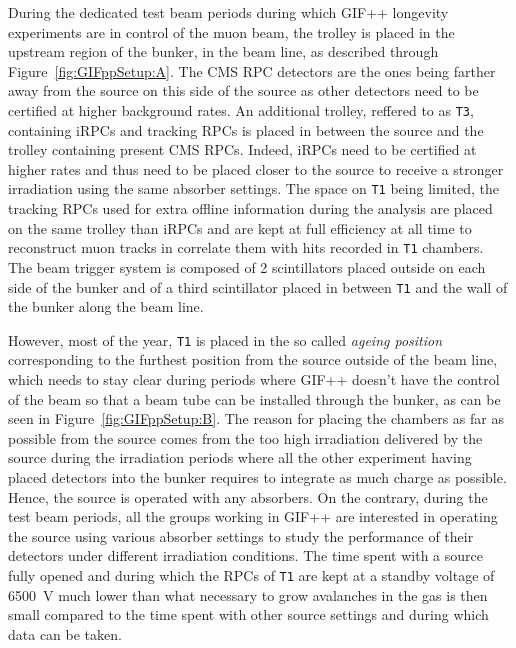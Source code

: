 	During the dedicated test beam periods during which GIF++ longevity experiments are in control of the muon beam, the trolley is placed in the upstream region of the bunker, in the beam line, as described through Figure~\ref{fig:GIFppSetup:A}. The CMS RPC detectors are the ones being farther away from the source on this side of the source as other detectors need to be certified at higher background rates. An additional trolley, reffered to as \texttt{T3}, containing iRPCs and tracking RPCs is placed in between the source and the trolley containing present CMS RPCs. Indeed, iRPCs need to be certified at higher rates and thus need to be placed closer to the source to receive a stronger irradiation using the same absorber settings. The space on \texttt{T1} being limited, the tracking RPCs used for extra offline information during the analysis are placed on the same trolley than iRPCs and are kept at full efficiency at all time to reconstruct muon tracks in correlate them with hits recorded in \texttt{T1} chambers. The beam trigger system is composed of 2 scintillators placed outside on each side of the bunker and of a third scintillator placed in between \texttt{T1} and the wall of the bunker along the beam line.
	
	However, most of the year, \texttt{T1} is placed in the so called \textit{ageing position} corresponding to the furthest position from the source outside of the beam line, which needs to stay clear during periods where GIF++ doesn't have the control of the beam so that a beam tube can be installed through the bunker, as can be seen in Figure~\ref{fig:GIFppSetup:B}. The reason for placing the chambers as far as possible from the source comes from the too high irradiation delivered by the source during the irradiation periods where all the other experiment having placed detectors into the bunker requires to integrate as much charge as possible. Hence, the source is operated with any absorbers. On the contrary, during the test beam periods, all the groups working in GIF++ are interested in operating the source using various absorber settings to study the performance of their detectors under different irradiation conditions. The time spent with a source fully opened and during which the RPCs of \texttt{T1} are kept at a standby voltage of \SI{6500}{V} much lower than what necessary to grow avalanches in the gas is then small compared to the time spent with other source settings and during which data can be taken.
	
